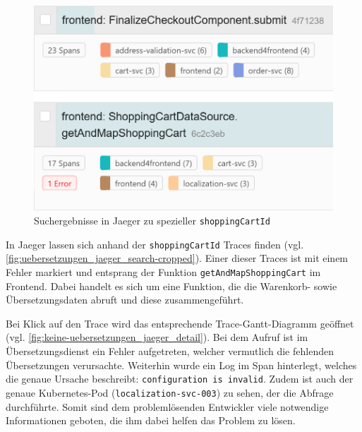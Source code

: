 \begin{figure}
\centering
\includegraphics[width=\linewidth]{img/05_ergebnis/keine-uebersetzungen_jaeger_search-cropped.png}
\caption{Suchergebnisse in Jaeger zu spezieller \texttt{shoppingCartId}}
\label{fig:uebersetzungen_jaeger_search-cropped}
\end{figure}

In Jaeger lassen sich anhand der \texttt{shopping\-Cart\-Id} Traces finden (vgl. \autoref{fig:uebersetzungen_jaeger_search-cropped}). Einer dieser Traces ist mit einem Fehler markiert und entsprang der Funktion \texttt{getAndMapShoppingCart} im Frontend. Dabei handelt es sich um eine Funktion, die die Warenkorb- sowie Übersetzungsdaten abruft und diese zusammengeführt.

Bei Klick auf den Trace wird das entsprechende Trace-Gantt-Diagramm geöffnet (vgl. \autoref{fig:keine-uebersetzungen_jaeger_detail}). Bei dem Aufruf ist im Übersetzungsdienst ein Fehler aufgetreten, welcher vermutlich die fehlenden Übersetzungen verursachte. Weiterhin wurde ein Log im Span hinterlegt, welches die genaue Ursache beschreibt: \texttt{configuration is invalid}. Zudem ist auch der genaue Kubernetes-Pod (\texttt{localization-svc-003}) zu sehen, der die Abfrage durchführte. Somit sind dem problemlösenden Entwickler viele notwendige Informationen geboten, die ihm dabei helfen das Problem zu lösen.

